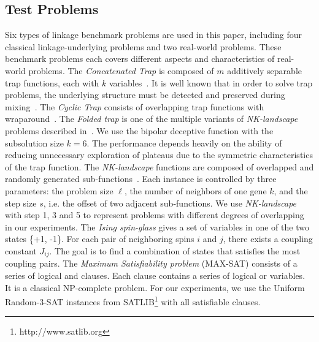 \documentclass{sig-alternate-05-2015}
\begin{document}
\subsection{Test Problems}
Six types of linkage benchmark problems are used in this paper, including four classical linkage-underlying problems and two real-world problems. These benchmark problems each covers different aspects and characteristics of real-world problems. The \textit{Concatenated Trap} is composed of $m$ additively separable trap functions, each with $k$ variables~\cite{deb:sufficient}. It is well known that in order to solve trap problems, the underlying structure must be detected and preserved during mixing~\cite{thierens:mixing}. The \textit{Cyclic Trap} consists of overlapping trap functions with wraparound~\cite{yu:overlapping}. The \textit{Folded trap} is one of the multiple variants of \textit{NK-landscape} problems described in~\cite{goldberg:deception}. We use the bipolar deceptive function with the subsolution size $k = 6$. 
The performance depends heavily on the ability of reducing unnecessary exploration of plateaus due to the symmetric characteristics of the trap function. The \textit{NK-landscape} functions are composed of overlapped and randomly generated sub-functions~\cite{pelikan:overlap}. Each instance is controlled by three parameters: the problem size $\ell$, the number of neighbors of one gene $k$, and the step size $s$, i.e. the offset of two adjacent sub-functions. We use \textit{NK-landscape} with step 1, 3 and 5 to represent problems with different degrees of overlapping in our experiments. The \textit{Ising spin-glass} gives a set of variables in one of the two states \{+1, -1\}. For each pair of neighboring spins $i$ and $j$, there exists a coupling constant $J_{ij}$. The goal is to find a combination of states that satisfies the most coupling pairs. The \textit{Maximum Satisfiability problem} (MAX-SAT) consists of a series of logical and clauses. Each clause contains a series of logical or variables. It is a classical NP-complete problem.  
For our experiments, we use the Uniform Random-3-SAT instances from SATLIB\footnote{http://www.satlib.org} with all satisfiable clauses.
\end{document}
